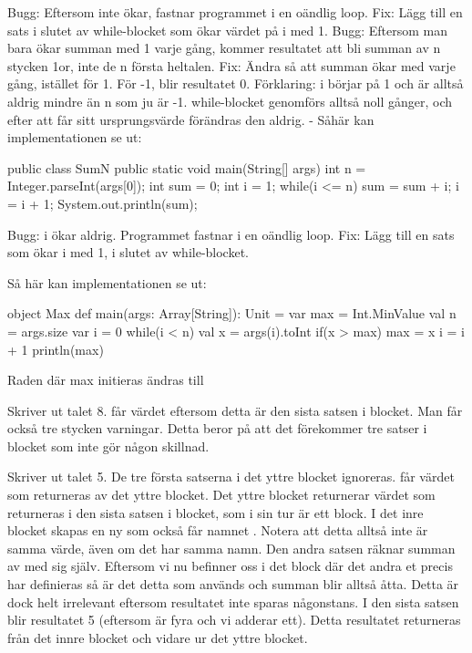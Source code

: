 \Task 
\Subtask Bugg: Eftersom  inte ökar, fastnar programmet i en oändlig loop. Fix: Lägg till en sats i slutet av while-blocket som ökar värdet på i med 1.
Bugg: Eftersom man bara ökar summan med 1 varje gång, kommer resultatet att bli summan av n stycken 1or, inte de n första heltalen. Fix: Ändra så att summan ökar med  varje gång, istället för 1.
För -1, blir resultatet 0. Förklaring: i börjar på 1 och är alltså aldrig mindre än n som ju är -1. while-blocket genomförs alltså noll gånger, och efter att  får sitt ursprungsvärde förändras den aldrig.
\Subtask -
\Subtask Såhär kan implementationen se ut:
\begin{Code}
public class SumN {
  public static void main(String[] args) {
    int n = Integer.parseInt(args[0]);
    int sum = 0;
    int i = 1;
    while(i <= n){
      sum = sum + i;
      i = i + 1;
      }
    }
    System.out.println(sum);
}
\end{Code}

\Task 
\Subtask Bugg: i ökar aldrig. Programmet fastnar i en oändlig loop. Fix: Lägg till en sats som ökar i med 1, i slutet av while-blocket.

\Subtask Så här kan implementationen se ut:
\begin{Code}
object Max {
  def main(args: Array[String]): Unit = {
    var max = Int.MinValue
    val n = args.size
    var i = 0
    while(i < n) {
      val x = args(i).toInt
      if(x > max) {
        max = x
      }
      i = i + 1
    }
    println(max)
  }
}
\end{Code}
\Subtask Raden där max initieras ändras till  

\Subtask {}

\Subtask Skriver ut talet 8.  får värdet  eftersom detta är den sista satsen i blocket. Man får också tre stycken varningar. Detta beror på att det förekommer tre satser i blocket som inte gör någon skillnad.

\Subtask Skriver ut talet 5. De tre första satserna i det yttre blocket ignoreras.  får värdet som returneras av det yttre blocket. Det yttre blocket returnerar värdet som returneras i den sista satsen i blocket, som i sin tur är ett block. I det inre blocket skapas en ny  som också får namnet . Notera att detta alltså inte är samma värde, även om det har samma namn. Den andra satsen räknar summan av  med sig själv. Eftersom vi nu befinner oss i det block där det andra et precis har definieras så är det detta  som används och summan blir alltså åtta. Detta är dock helt irrelevant eftersom resultatet inte sparas någonstans. I den sista satsen blir resultatet 5 (eftersom  är fyra och vi adderar ett). Detta resultatet returneras från det innre blocket och vidare ur det yttre blocket.

